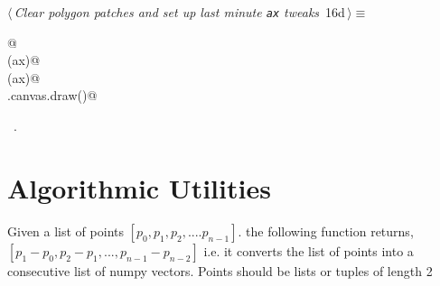\documentclass[11.5pt]{report}
\begin{document}
\begin{flushleft} \small
\begin{minipage}{\linewidth}\label{scrap10}\raggedright\small
{} $\langle\,${\itshape Clear polygon patches and set up last minute \verb|ax| tweaks}\nobreak\ {\footnotesize {16d}}$\,\rangle\equiv$
\vspace{-1ex}
\begin{list}{}{} \item
\mbox{}\verb@   @\\
\mbox{}\verb@clearAxPolygonPatches(ax)@\\
\mbox{}\verb@applyAxCorrection(ax)@\\
\mbox{}\verb@fig.canvas.draw()@\\
\mbox{}\verb@@{\NWsep}
\end{list}
\vspace{-1.5ex}
\footnotesize
\begin{list}{}{\setlength{\itemsep}{-\parsep}\setlength{\itemindent}{-\leftmargin}}
\item \NWtxtMacroRefIn\ .

\item{}
\end{list}
\end{minipage}\vspace{4ex}
\end{flushleft}

\section{Algorithmic Utilities}

\newchunk Given a list of  points $[p_0,p_1,p_2,....p_{n-1}]$. 
    the following function returns, $[p_1-p_0, p_2-p_1,...,p_{n-1}-p_{n-2}]$
    i.e. it converts the list of points into a consecutive list of numpy vectors. 
    Points should be lists or tuples of length 2
\end{document}
